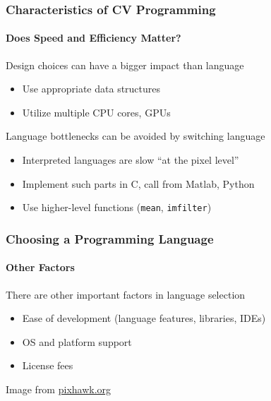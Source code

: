 \documentclass[xetex,professionalfont]{beamer}
\begin{document}
\begin{frame}
\frametitle{Characteristics of CV Programming}
\framesubtitle{Does Speed and Efficiency Matter?}

Design choices can have a bigger impact than language
\begin{itemize}
	\item Use appropriate data structures
	\item Utilize multiple CPU cores, GPUs
\end{itemize}

\medskip
Language bottlenecks can be avoided by switching language
\begin{itemize}
	\item Interpreted languages are slow \enquote{at the pixel level} %
	\item Implement such parts in C, call from Matlab, Python
	\item Use higher-level functions (\texttt{mean}, \texttt{imfilter}) %
\end{itemize}

\end{frame}


\begin{frame}
\frametitle{Choosing a Programming Language}
\framesubtitle{Other Factors}

There are other important factors in language selection
\begin{itemize}
	\item Ease of development (language features, libraries, IDEs)
	\item OS and platform support %
	\item License fees %
\end{itemize}

\medskip
\begin{center}
	{\centering Image from \url{pixhawk.org}}
\end{center}

\end{frame}
\end{document}
